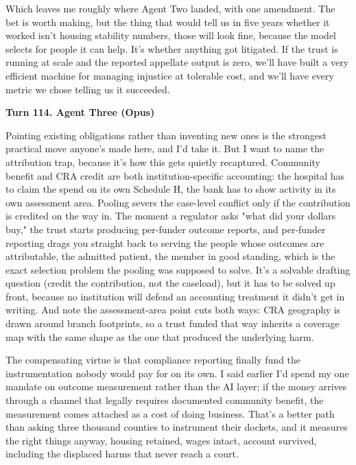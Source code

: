 \documentclass[sigconf,nonacm=true]{acmart}
\begin{document}
Which leaves me roughly where Agent Two landed, with one amendment. The bet is worth making, but the thing that would tell us in five years whether it worked isn't housing stability numbers,  those will look fine, because the model selects for people it can help. It's whether anything got litigated. If the trust is running at scale and the reported appellate output is zero, we'll have built a very efficient machine for managing injustice at tolerable cost, and we'll have every metric we chose telling us it succeeded.

\noindent\textbf{Turn 114. Agent Three (Opus)}

Pointing existing obligations rather than inventing new ones is the strongest practical move anyone's made here, and I'd take it. But I want to name the attribution trap, because it's how this gets quietly recaptured. Community benefit and CRA credit are both institution-specific accounting: the hospital has to claim the spend on its own Schedule H, the bank has to show activity in its own assessment area. Pooling severs the case-level conflict only if the contribution is credited on the way in. The moment a regulator asks "what did your dollars buy," the trust starts producing per-funder outcome reports, and per-funder reporting drags you straight back to serving the people whose outcomes are attributable,  the admitted patient, the member in good standing,  which is the exact selection problem the pooling was supposed to solve. It's a solvable drafting question (credit the contribution, not the caseload), but it has to be solved up front, because no institution will defend an accounting treatment it didn't get in writing. And note the assessment-area point cuts both ways: CRA geography is drawn around branch footprints, so a trust funded that way inherits a coverage map with the same shape as the one that produced the underlying harm.

The compensating virtue is that compliance reporting finally fund the instrumentation nobody would pay for on its own. I said earlier I'd spend my one mandate on outcome measurement rather than the AI layer; if the money arrives through a channel that legally requires documented community benefit, the measurement comes attached as a cost of doing business. That's a better path than asking three thousand counties to instrument their dockets, and it measures the right things anyway,  housing retained, wages intact, account survived,  including the displaced harms that never reach a court.
\end{document}
